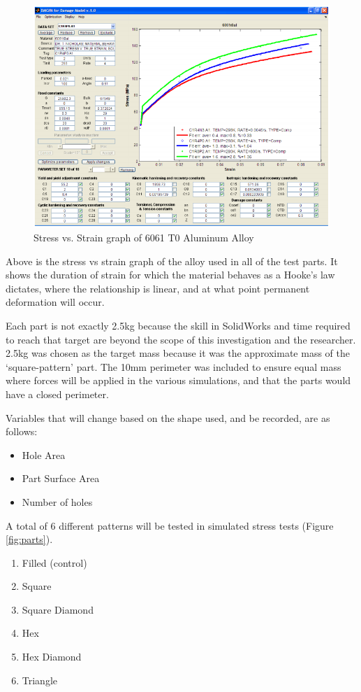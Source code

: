 \documentclass[12pt, letterpaper]{article}
\newcommand{\sorta}[1]{`#1'}
\begin{document}
\begin{figure}[H]
	\centering
	\label{fig:6061ss}
	\includegraphics[width=.8\linewidth]{6061ss}
	\caption{Stress vs. Strain graph of 6061 T0 Aluminum Alloy\autocite{noauthor_ssc_nodate}}
\end{figure}

Above is the stress vs strain graph of the alloy used in all of the test parts. It shows the duration of strain for which the material behaves as a Hooke's law dictates, where the relationship is linear, and at what point permanent deformation will occur. 

Each part is not exactly 2.5kg because the skill in SolidWorks and time required to reach that target are beyond the scope of this investigation and the researcher. 2.5kg was chosen as the target mass because it was the approximate mass of the \sorta{square-pattern} part. The 10mm perimeter was included to ensure equal mass where forces will be applied in the various simulations, and that the parts would have a closed perimeter. 

Variables that will change based on the shape used, and be recorded, are as follows:

\begin{itemize}
\item Hole Area
\item Part Surface Area
\item Number of holes
\end{itemize}

A total of 6 different patterns will be tested in simulated stress tests (Figure \ref{fig:parts}).

\begin{enumerate}
\item Filled (control)
\item Square
\item Square Diamond
\item Hex
\item Hex Diamond
\item Triangle
\end{enumerate}
\end{document}
